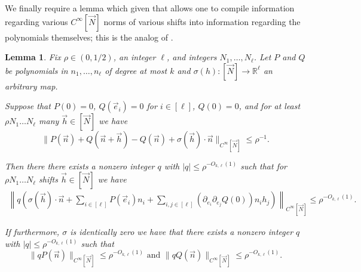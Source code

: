 \documentclass[11pt, a4paper]{amsart}
\theoremstyle{plain}
\theoremstyle{plain}
\newtheorem{lemma}{Lemma}
\theoremstyle{definition}
\theoremstyle{remark}
\numberwithin{equation}{section}
\numberwithin{lemma}{section}
\numberwithin{proposition}{section}
\numberwithin{corollary}{section}
\numberwithin{definition}{section}
\numberwithin{claim}{section}
\begin{document}
We finally require a lemma which given that allows one to compile information regarding various $C^{\infty}[\vec{N}]$ norms of various shifts into information regarding the polynomials themselves; this is the analog of \cite[Lemma~7.6]{GT12}. 
\begin{lemma}\label{l:polynomialseparation}
Fix $\rho\in (0,1/2)$, an integer $\ell$, and integers $N_1,\ldots,N_{\ell}$. Let $P$ and $Q$ be polynomials in $n_1,\ldots,n_{\ell}$ of degree at most $k$ and $\sigma(h):[\vec{N}]\to \mathbb{R}^{\ell}$ an arbitrary map. 

Suppose that $P(0) = 0$, $Q(\vec{e}_i) = 0$ for $i\in [\ell]$, $Q(0) = 0$, and for at least $\rho N_1\ldots N_{\ell}$ many $\vec{h} \in [\vec{N}]$ we have 
\[\|P(\vec{n}) + Q(\vec{n} + \vec{h}) - Q(\vec{n}) + \sigma(\vec{h}) \cdot \vec{n}\|_{C^{\infty}[\vec{N}]}\le \rho^{-1}.\]

Then there there exists a nonzero integer $q$ with $|q|\le \rho^{-O_{k,\ell}(1)}$ such that for $\rho N_1\ldots N_{\ell}$ shifts $\vec{h} \in [\vec{N}]$ we have
\begin{align*}
\left\|q\left(\sigma(\vec{h}) \cdot \vec{n} + \sum_{i\in [\ell]}P(\vec{e}_i) n_i+ \sum_{i, j \in [\ell]} (\partial_{e_i}\partial_{e_j}Q(0)) n_ih_j\right)\right\|_{C^\infty[\vec{N}]} \le \rho^{-O_{k,\ell}(1)}.
\end{align*}

If furthermore, $\sigma$ is identically zero we have that there exists a nonzero integer $q$ with $|q|\le \rho^{-O_{k,\ell}(1)}$ such that 
\[\|qP(\vec{n})\|_{C^{\infty}[\vec{N}]}\le \rho^{-O_{k,\ell}(1)}\text{ and } \|qQ(\vec{n})\|_{C^{\infty}[\vec{N}]}\le \rho^{-O_{k,\ell}(1)}.\]
\end{lemma}
\end{document}
